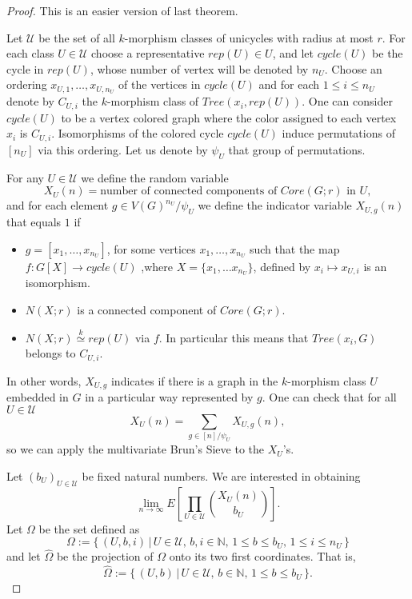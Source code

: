 \documentclass[11pt,notitlepage]{report}
\theoremstyle{definition}
\theoremstyle{remark}
\newcommand{\N}{\mathbb{N}}
\newcommand{\Ln}{\lim\limits_{n\to \infty}}
\newcommand{\morph}[1]{\stackrel{#1}{\simeq}}
\begin{document}
\begin{proof}
	This is an easier version of last theorem. \par
	Let $\mathcal{U}$ be the set of all $k$-morphism classes of 
	unicycles with radius at most $r$. 
	For each class $U\in \mathcal{U}$ choose a representative $rep(U)\in U$, 
	and let  $cycle(U)$ be the cycle in $rep(U)$, whose number of vertex will be
	denoted by $n_U$. Choose an ordering $x_{U,1},\dots, x_{U,n_U}$
	of the vertices in $cycle(U)$ and for each $1\leq i \leq n_{U}$ 
	denote by $C_{U,i}$ the $k$-morphism class
	of $Tree(x_i,rep(U))$. One can consider $cycle(U)$ to be a 
	vertex colored graph where the color assigned to each vertex $x_i$
    is $C_{U,i}$. Isomorphisms of the colored cycle 
	$cycle(U)$ induce permutations of $[n_U]$ via this ordering. 
	Let us denote by $\psi_U$ that group of permutations.\par 
	For any $U\in \mathcal{U}$ we define the random variable 
	\[X_{U}(n)=\text{number of connected components of }Core(G;r) 
	\text{ in } U ,\]
	and for each element $g\in V(G)^{n_U}/\psi_U$ 
	we define the indicator variable $X_{U,g}(n)$ that equals $1$ if 
	\begin{itemize}
		\item $g=[x_1,\dots, x_{n_U}]$, for some vertices
		$x_1,\dots, x_{n_U}$ such that the map $f:G[X]\rightarrow cycle(U)$ 
		,where $X=\{x_1,\dots x_{n_U}\}$, defined by $x_i\mapsto x_{U,i}$ is an
		isomorphism. 
		\item $N(X;r)$ is a connected component of $Core(G;r)$.
		\item $N(X;r)\morph{k} rep(U)$ via $f$. In particular this means
		that $Tree(x_i, G)$ belongs to $C_{U,i}$.
	\end{itemize}	
	In other words, $X_{U,g}$ indicates if there is a graph in the $k$-morphism
	class $U$ embedded in $G$ in a particular way represented by $g$.
	One can check that for all $U\in \mathcal{U}$
	\[ X_U(n)=\sum_{g\in [n]/\psi_U} X_{U,g}(n),  \]
	so we can apply the multivariate Brun's Sieve to the $X_U$'s.\par
	Let $(b_U)_{U\in \mathcal{U}}$ be fixed natural numbers. We are interested
	in obtaining
	\[\Ln E\left[\prod_{U\in \mathcal{U}}
	\binom{X_{U}(n)}{b_{U}}\right].\]
	Let $\Omega$ be the set defined as
	\[ \Omega:= \{\, (U,b,i) \, | \, U\in \mathcal{U}, 
	\, b,i\in \N, \, 1\leq b \leq b_U,  \, 1\leq i \leq n_U\,  \}\]
	and let $\widehat{\Omega}$ be the projection of $\Omega$ onto its
	two first coordinates. That is, 
	\[\widehat{\Omega}:=\{\, (U,b) \, | \, U\in \mathcal{U}, 
	\, b\in \N, \, 1\leq b \leq b_U \, \}. \] 


\end{proof}
\end{document}
